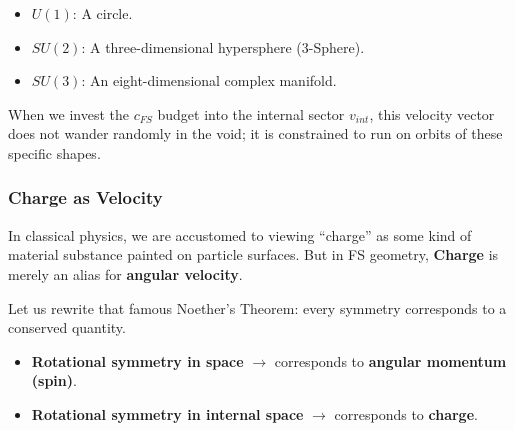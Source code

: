 \begin{itemize}
\item \textbf{$U(1)$}: A circle.

\item \textbf{$SU(2)$}: A three-dimensional hypersphere (3-Sphere).

\item \textbf{$SU(3)$}: An eight-dimensional complex manifold.
\end{itemize}

When we invest the $c_{FS}$ budget into the internal sector $v_{int}$, this velocity vector does not wander randomly in the void; it is constrained to run on orbits of these specific shapes.

\subsubsection{Charge as Velocity}

In classical physics, we are accustomed to viewing ``charge'' as some kind of material substance painted on particle surfaces. But in FS geometry, \textbf{Charge} is merely an alias for \textbf{angular velocity}.

Let us rewrite that famous Noether's Theorem: every symmetry corresponds to a conserved quantity.

\begin{itemize}
\item \textbf{Rotational symmetry in space} $\rightarrow$ corresponds to \textbf{angular momentum (spin)}.

\item \textbf{Rotational symmetry in internal space} $\rightarrow$ corresponds to \textbf{charge}.
\end{itemize}

